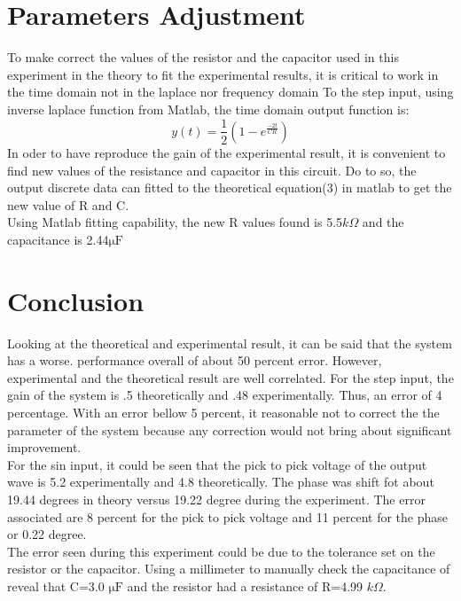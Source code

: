 \documentclass[12pt,letterpaper]{article}
\begin{document}
\section*{Parameters Adjustment}
To make correct the values of the resistor and the capacitor used in this experiment in the theory
to fit the experimental results, it is critical to work in the time domain not in the laplace nor frequency domain
    To the step input, using inverse laplace function  from Matlab, the time domain output function  is:\\
    \begingroup
    \Large
    \begin{equation}
        y(t)=\frac{1}{2}({1} - e^{\frac{-2t}{CR}})
    \end{equation}
    \endgroup
    In oder to have reproduce the gain of the experimental result, it is convenient to find 
    new values of the resistance and capacitor in this circuit. Do to so, the output discrete data can 
    fitted to the theoretical equation(3) in matlab to get the new value of R and C. \\
    Using Matlab fitting capability, the new R values found is 5.5\(k{\Omega}\) and the capacitance is 2.44\(\si{\micro\farad}\)

\section*{Conclusion}
Looking at the theoretical and experimental result, it can be said that the system has a worse. 
performance overall of about 50 percent error. However, experimental and the theoretical result 
are well correlated. For the step input, the gain of the system is .5 theoretically and .48 experimentally.
Thus, an error of 4 percentage. With an error bellow 5 percent, it reasonable not to correct the
the parameter of the system because any correction would not bring about significant improvement.\\
For the sin input, it could be seen that the pick to pick voltage of the output wave is 5.2 experimentally and 4.8 theoretically. The 
phase was shift fot about 19.44 degrees in theory versus 19.22 degree during the experiment.
The error associated are  8 percent for the pick to pick voltage and 11 percent for the phase or 0.22 degree. \\
The error seen during this experiment could be due to the tolerance set on the resistor or the capacitor. 
Using a millimeter to manually check the capacitance of reveal that C=3.0 \(\si{\micro\farad}\) and the resistor had a resistance of 
R=4.99 \(k{\Omega}\). 
\end{document}
